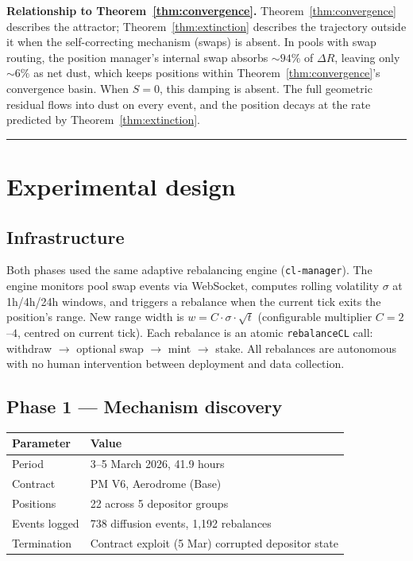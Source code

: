 \documentclass[11pt,a4paper]{article}
\begin{document}
\textbf{Relationship to Theorem~\ref{thm:convergence}.} Theorem~\ref{thm:convergence} describes the attractor; Theorem~\ref{thm:extinction} describes the trajectory outside it when the self-correcting mechanism (swaps) is absent. In pools with swap routing, the position manager's internal swap absorbs ${\sim}94\%$ of $\Delta R$, leaving only ${\sim}6\%$ as net dust, which keeps positions within Theorem~\ref{thm:convergence}'s convergence basin. When $S = 0$, this damping is absent. The full geometric residual flows into dust on every event, and the position decays at the rate predicted by Theorem~\ref{thm:extinction}.

\begin{center}\rule{0.5\linewidth}{0.5pt}\end{center}

\section{Experimental design}\label{sec:experimental}

\subsection{Infrastructure}\label{sec:infrastructure}

Both phases used the same adaptive rebalancing engine (\texttt{cl-manager}). The engine monitors pool swap events via WebSocket, computes rolling volatility $\sigma$ at 1h/4h/24h windows, and triggers a rebalance when the current tick exits the position's range. New range width is $w = C \cdot \sigma \cdot \sqrt{t}$ (configurable multiplier $C = 2$--$4$, centred on current tick). Each rebalance is an atomic \texttt{rebalanceCL} call: withdraw $\to$ optional swap $\to$ mint $\to$ stake. All rebalances are autonomous with no human intervention between deployment and data collection.

\subsection{Phase 1 --- Mechanism discovery}\label{sec:phase1}

\begin{table}[H]
\centering
\begin{tabular}{@{}ll@{}}
\toprule
Parameter & Value \\
\midrule
Period          & 3--5 March 2026, 41.9 hours \\
Contract        & PM V6, Aerodrome (Base) \\
Positions       & 22 across 5 depositor groups \\
Events logged   & 738 diffusion events, 1{,}192 rebalances \\
Termination     & Contract exploit (5 Mar) corrupted depositor state \\
\bottomrule
\end{tabular}
\end{table}
\end{document}
